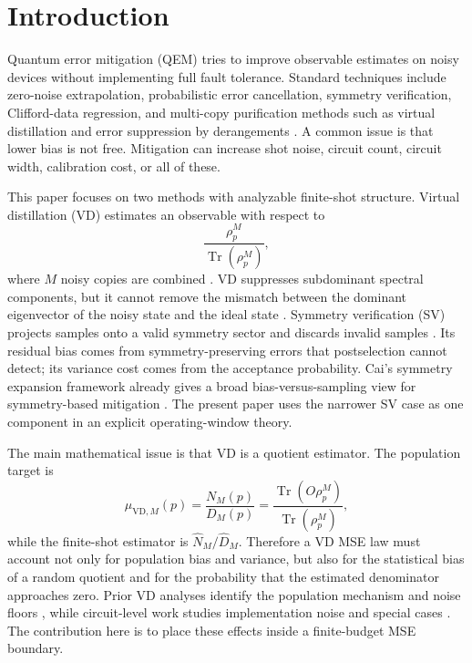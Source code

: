 \documentclass[11pt]{article}
\DeclareMathOperator{\Tr}{Tr}
\newcommand{\1}{\mathbf{1}}
\begin{document}
\section{Introduction}

Quantum error mitigation (QEM) tries to improve observable estimates on noisy devices without implementing full fault tolerance.  Standard techniques include zero-noise extrapolation, probabilistic error cancellation, symmetry verification, Clifford-data regression, and multi-copy purification methods such as virtual distillation and error suppression by derangements \citep{Temme2017,LiBenjamin2017,Endo2018,BonetMonroig2018,McArdle2019,Czarnik2021,Lowe2021,Huggins2021,Koczor2021PRX,Bultrini2023,Ijaz2024}.  A common issue is that lower bias is not free.  Mitigation can increase shot noise, circuit count, circuit width, calibration cost, or all of these.

This paper focuses on two methods with analyzable finite-shot structure.  Virtual distillation (VD) estimates an observable with respect to
\begin{equation}
    \frac{\rho_p^M}{\Tr(\rho_p^M)},
\end{equation}
where \(M\) noisy copies are combined \citep{Huggins2021,Koczor2021PRX}.  VD suppresses subdominant spectral components, but it cannot remove the mismatch between the dominant eigenvector of the noisy state and the ideal state \citep{Koczor2021NJP}.  Symmetry verification (SV) projects samples onto a valid symmetry sector and discards invalid samples \citep{BonetMonroig2018,McArdle2019,Kakkar2022}.  Its residual bias comes from symmetry-preserving errors that postselection cannot detect; its variance cost comes from the acceptance probability.  Cai's symmetry expansion framework already gives a broad bias-versus-sampling view for symmetry-based mitigation \citep{Cai2021}.  The present paper uses the narrower SV case as one component in an explicit operating-window theory.

The main mathematical issue is that VD is a quotient estimator.  The population target is
\begin{equation}
    \mu_{\mathrm{VD},M}(p)=\frac{N_M(p)}{D_M(p)}
    =\frac{\Tr(O\rho_p^M)}{\Tr(\rho_p^M)},
\end{equation}
while the finite-shot estimator is \(\widehat N_M/\widehat D_M\).  Therefore a VD MSE law must account not only for population bias and variance, but also for the statistical bias of a random quotient and for the probability that the estimated denominator approaches zero.  Prior VD analyses identify the population mechanism and noise floors \citep{Huggins2021,Koczor2021PRX,Koczor2021NJP}, while circuit-level work studies implementation noise and special cases \citep{Teo2022,Vikstal2024}.  The contribution here is to place these effects inside a finite-budget MSE boundary.
\end{document}
